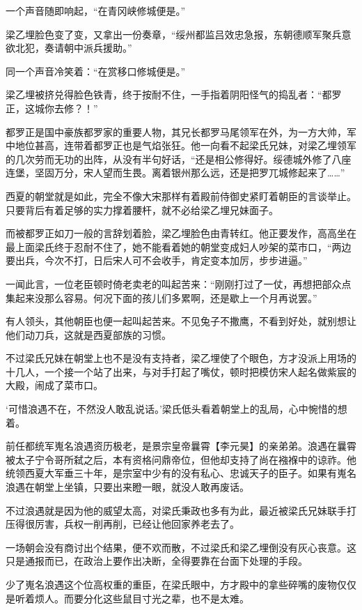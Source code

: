 一个声音随即响起，“在青冈峡修城便是。”

梁乙埋脸色变了变，又拿出一份奏章，“绥州都监吕效忠急报，东朝德顺军聚兵意欲北犯，奏请朝中派兵援助。”

同一个声音冷笑着：“在赏移口修城便是。”

梁乙埋被挤兑得脸色铁青，终于按耐不住，一手指着阴阳怪气的捣乱者：“都罗正，这城你去修？！”

都罗正是国中豪族都罗家的重要人物，其兄长都罗马尾领军在外，为一方大帅，军中地位甚高，连带着都罗正也是气焰张狂。他一向看不起梁氏兄妹，对梁乙埋领军的几次劳而无功的出阵，从没有半句好话，“还是相公修得好。绥德城外修了八座连堡，坚固万分，宋人望而生畏。离着银州那么远，还是把罗兀城修起来了……”

西夏的朝堂就是如此，完全不像大宋那样有着殿前侍御史紧盯着朝臣的言谈举止。只要背后有着足够的实力撑着腰杆，就不必给梁乙埋兄妹面子。

而被都罗正如刀一般的言辞划着脸，梁乙埋脸色由青转红。他正要发作，高高坐在最上面梁氏终于忍耐不住了，她不能看着她的朝堂变成妇人吵架的菜市口，“两边要出兵，今次不打，日后宋人可不会收手，肯定变本加厉，步步进逼。”

一闻此言，一位老臣顿时倚老卖老的叫起苦来：“刚刚打过了一仗，再想把部众点集起来没那么容易。何况下面的孩儿们多累啊，还是歇上一个月再说罢。”

有人领头，其他朝臣也便一起叫起苦来。不见兔子不撒鹰，不看到好处，就别想让他们动刀兵，这就是西夏部族的习惯。

不过梁氏兄妹在朝堂上也不是没有支持者，梁乙埋使了个眼色，方才没派上用场的十几人，一个接一个站了出来，与对手打起了嘴仗，顿时把模仿宋人起名做紫宸的大殿，闹成了菜市口。

‘可惜浪遇不在，不然没人敢乱说话。’梁氏低头看着朝堂上的乱局，心中惋惜的想着。

前任都统军嵬名浪遇资历极老，是景宗皇帝曩霄【李元昊】的亲弟弟。浪遇在曩霄被太子宁令哥所弑之后，本有资格问鼎帝位，但他却支持了尚在襁褓中的谅祚。他统领西夏大军垂三十年，是宗室中少有的没有私心、忠诚天子的臣子。如果有嵬名浪遇在朝堂上坐镇，只要出来瞪一眼，就没人敢再废话。

不过浪遇就是因为他的威望太高，对梁氏秉政也多有为此，最近被梁氏兄妹联手打压得很厉害，兵权一削再削，已经让他回家养老去了。

一场朝会没有商讨出个结果，便不欢而散，不过梁氏和梁乙埋倒没有灰心丧意。这只是通报而已，在政治上要作出决断，全得要靠在台面下处理的手段。

少了嵬名浪遇这个位高权重的重臣，在梁氏眼中，方才殿中的拿些碎嘴的废物仅仅是听着烦人。而要分化这些鼠目寸光之辈，也不是太难。

